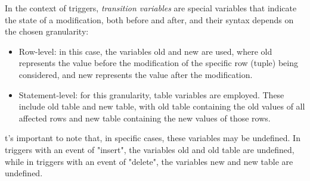 \documentclass[12pt, a4paper]{report}
\begin{document}
    \begin{definition}
        In the context of triggers, \emph{transition variables} are special variables that indicate the state of a modification, both before and after, and their syntax depends on the chosen granularity:
        \begin{itemize}
            \item Row-level: in this case, the variables old and new are used, where old represents the value before the modification of the specific row (tuple) being considered, and new represents the value after the modification.
            \item Statement-level: for this granularity, table variables are employed. 
                These include old table and new table, with old table containing the old values of all affected rows and new table containing the new values of those rows.
        \end{itemize}
    \end{definition}
    t's important to note that, in specific cases, these variables may be undefined. 
    In triggers with an event of "insert", the variables old and old table are undefined, while in triggers with an event of "delete", the variables new and new table are undefined.  
\end{document}
